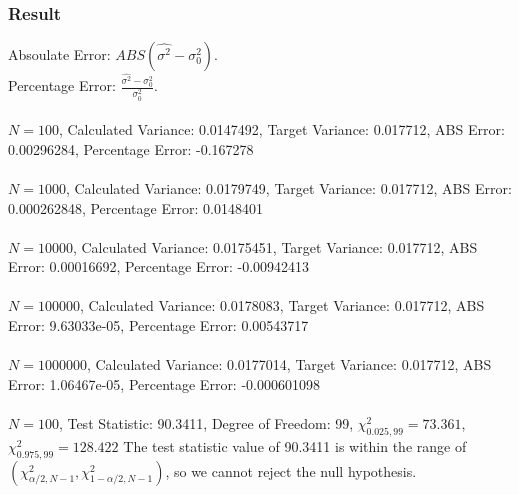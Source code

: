 \documentclass[12pt]{article}
\begin{document}
\subsubsection{Result}
Absoulate Error: $ABS(\hat{\sigma^2} -\sigma^2_0)$.
\\
Percentage Error: $\frac{\hat{\sigma^2}-\sigma^2_0}{\sigma^2_0}$.
\\
\\
$N = 100$, 
Calculated Variance: 0.0147492, Target Variance: 0.017712, ABS Error: 0.00296284, Percentage Error: -0.167278
\\
\\
$N = 1000$, 
Calculated Variance: 0.0179749, Target Variance: 0.017712, ABS Error: 0.000262848, Percentage Error: 0.0148401
\\
\\
$N = 10000$,
Calculated Variance: 0.0175451, Target Variance: 0.017712, ABS Error: 0.00016692, Percentage Error: -0.00942413
\\
\\
$N = 100000$,
Calculated Variance: 0.0178083, Target Variance: 0.017712, ABS Error: 9.63033e-05, Percentage Error: 0.00543717
\\
\\
$N = 1000000$,
Calculated Variance: 0.0177014, Target Variance: 0.017712, ABS Error: 1.06467e-05, Percentage Error: -0.000601098
\\
\\
$N = 100$, Test Statistic: 90.3411, Degree of Freedom: 99, 
$\chi^2_{0.025,99} = 73.361$, $\chi^2_{0.975,99} = 128.422$
The test statistic value of 90.3411 is within the range of $\left(\chi^2_{\alpha/2,N-1}, \chi^2_{1-\alpha/2,N-1}\right)$,
so we cannot reject the null hypothesis.



\end{document}
